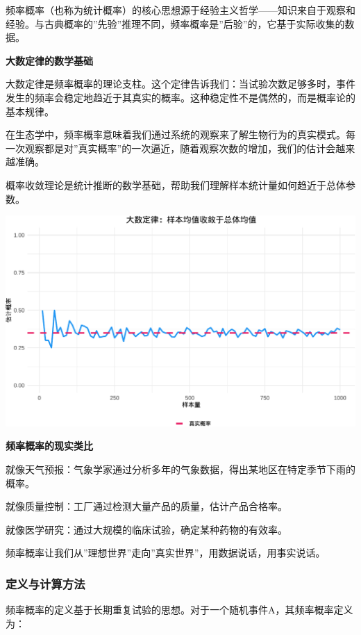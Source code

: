 \documentclass[
]{book}
\begin{document}
频率概率（也称为统计概率）的核心思想源于经验主义哲学------知识来自于观察和经验。与古典概率的''先验''推理不同，频率概率是''后验''的，它基于实际收集的数据。

\textbf{大数定律的数学基础}

大数定律是频率概率的理论支柱。这个定律告诉我们：当试验次数足够多时，事件发生的频率会稳定地趋近于其真实的概率。这种稳定性不是偶然的，而是概率论的基本规律。

在生态学中，频率概率意味着我们通过系统的观察来了解生物行为的真实模式。每一次观察都是对''真实概率''的一次逼近，随着观察次数的增加，我们的估计会越来越准确。

概率收敛理论是统计推断的数学基础，帮助我们理解样本统计量如何趋近于总体参数。

\begin{center}\includegraphics[width=0.8\linewidth]{ecological-statistics_files/figure-latex/unnamed-chunk-5-1} \end{center}

\textbf{频率概率的现实类比}

就像天气预报：气象学家通过分析多年的气象数据，得出某地区在特定季节下雨的概率。

就像质量控制：工厂通过检测大量产品的质量，估计产品合格率。

就像医学研究：通过大规模的临床试验，确定某种药物的有效率。

频率概率让我们从''理想世界''走向''真实世界''，用数据说话，用事实说话。

\hypertarget{ux5b9aux4e49ux4e0eux8ba1ux7b97ux65b9ux6cd5}{%
\subsubsection{定义与计算方法}\label{ux5b9aux4e49ux4e0eux8ba1ux7b97ux65b9ux6cd5}}

频率概率的定义基于长期重复试验的思想。对于一个随机事件A，其频率概率定义为：
\end{document}
